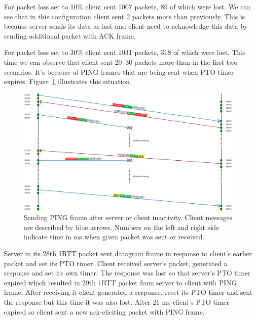 For packet loss set to 10\% client sent 1007 packets, 89 of which were lost.
We can see that in this configuration client sent 2 packets more than previously.
This is because server sends its data as last and client need to acknowledge this data by sending additional packet with ACK frame.

For packet loss set to 30\% client sent 1031 packets, 318 of which were lost.
This time we can observe that client sent 20--30 packets more than in the first two scenarios.
It's because of PING frames that are being sent when PTO timer expires.
Figure~\ref{fig:dgram_ping_frames} illustrates this situation.

\begin{figure}
    \centering
    \includegraphics[width=\textwidth]{img/__09__datagrams/dgram_retransmission_ping.png}
    \caption{Sending PING frame after server or client inactivity.
    Client messages are described by blue arrows.
    Numbers on the left and right side indicate time in ms when given packet was sent or received.}
    \label{fig:dgram_ping_frames}
\end{figure}

Server in its 28th 1RTT packet sent datagram frame in response to client's earlier packet and set its PTO timer.
Client received server's packet, generated a response and set its own timer.
The response was lost so that server's PTO timer expired which resulted in 29th 1RTT packet from server to client with PING frame.
After receiving it client generated a response, reset its PTO timer and sent the response but this time it was also lost.
After 21 ms client's PTO timer expired so client sent a new ack-eliciting packet with PING frame.

